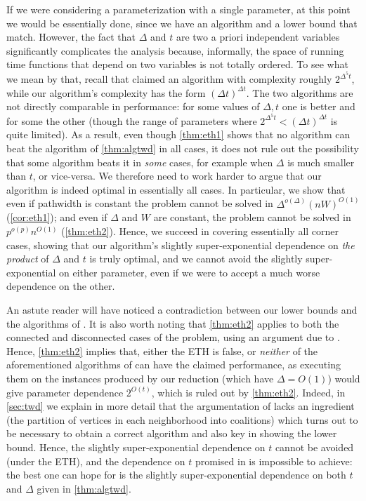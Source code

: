 \documentclass[letterpaper,USenglish,cleveref, autoref, thm-restate]{lipics-v2021}
\begin{document}
If we were considering a parameterization with a single parameter, at this
point we would be essentially done, since we have an algorithm and a lower
bound that match.  However, the fact that $\Delta$ and $t$ are two a priori
independent variables significantly complicates the analysis because,
informally, the space of running time functions that depend on two variables is
not totally ordered.  To see what we mean by that, recall that \cite{Peters16a}
claimed an algorithm with complexity roughly $2^{\Delta^5t}$, while our
algorithm's complexity has the form $(\Delta t)^{\Delta t}$.  The two
algorithms are not directly comparable in performance: for some values of
$\Delta,t$ one is better and for some the other (though the range of parameters
where $2^{\Delta^5t}<(\Delta t)^{\Delta t}$ is quite limited). As a result,
even though \cref{thm:eth1} shows that no algorithm can beat the algorithm of
\cref{thm:algtwd} in all cases, it does not rule out the possibility that some
algorithm beats it in \emph{some} cases, for example when $\Delta$ is much
smaller than $t$, or vice-versa.  We therefore need to work harder to argue
that our algorithm is indeed optimal in essentially all cases.  In particular,
we show that even if pathwidth is constant the problem cannot be solved in
$\Delta^{o(\Delta)}(nW)^{O(1)}$ (\cref{cor:eth1}); and even if $\Delta$ and $W$
are constant, the problem cannot be solved in $p^{o(p)}n^{O(1)}$
(\cref{thm:eth2}).  Hence, we succeed in covering essentially all corner cases,
showing that our algorithm's slightly super-exponential dependence on \emph{the
product} of $\Delta$ and $t$ is truly optimal, and we cannot avoid the slightly
super-exponential on either parameter, even if we were to accept a much worse
dependence on the other.

An astute reader will have noticed a contradiction between our lower bounds and
the algorithms of \cite{Peters16a}. It is also worth noting that
\cref{thm:eth2} applies to both the connected and disconnected cases of the
problem, using an argument due to \cite{Peters16a}.  Hence, \cref{thm:eth2}
implies that, either the ETH is false, or \emph{neither} of the aforementioned
algorithms of \cite{Peters16a} can have the claimed performance, as executing
them on the instances produced by our reduction (which have $\Delta=O(1)$)
would give parameter dependence $2^{O(t)}$, which is ruled out by
\cref{thm:eth2}.  Indeed, in \cref{sec:twd} we explain in more detail that the
argumentation of \cite{Peters16a} lacks an ingredient (the partition of
vertices in each neighborhood into coalitions) which turns out to be necessary
to obtain a correct algorithm and also key in showing the lower bound. Hence,
the slightly super-exponential dependence on $t$ cannot be avoided (under the
ETH), and the dependence on $t$ promised in \cite{Peters16a} is impossible to
achieve: the best one can hope for is the slightly super-exponential dependence
on both $t$ and $\Delta$ given in \cref{thm:algtwd}.
\end{document}
